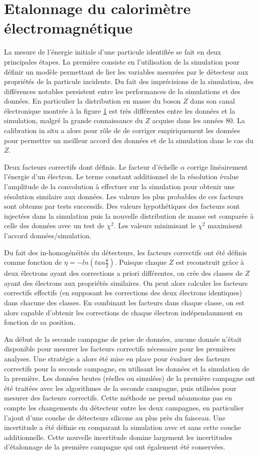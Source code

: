 \section{Etalonnage du calorimètre électromagnétique}

La mesure de l'énergie initiale d'une particule identifiée se fait en deux principales étapes.
La première consiste en l'utilisation de la simulation pour définir un modèle permettant de lier les variables mesurées par le détecteur aux propriétés de la particule incidente.
Du fait des imprécisions de la simulation, des différences notables persistent entre les performances de la simulations et des données.
En particulier la distribution en masse du boson $Z$ dans son canal électronique montrée à la figure \ref{} est très différentes entre les données et la simulation, malgré la grande connaissance du $Z$ acquise dans les années 80.
La calibration in situ a alors pour rôle de de corriger empiriquement les données pour permettre un meilleur accord des données et de la simulation dans le cas du $Z$.

Deux facteurs correctifs dont définis.
Le facteur d'échelle $\alpha$ corrige linéairement l'énergie d'un électron.
Le terme constant additionnel de la résolution évalue l'amplitude de la convolution à effectuer sur la simulation pour obtenir une résolution similaire aux données.
Les valeurs les plus probables de ces facteurs sont obtenus par tests successifs.
Des valeurs hypothétiques des facteurs sont injectées dans la simulation puis la nouvelle distribution de masse est comparée à celle des données avec un test de $\chi^2$.
Les valeurs minimisant le $\chi^2$ maximisent l'accord données/simulation.

Du fait des in-homogénéités du détecteurs, les facteurs correctifs ont été définis comme fonction de $\eta=-ln(tan\frac{\theta}{2})$.
Puisque chaque $Z$ est reconstruit grâce à deux électrons ayant des corrections a priori différentes, on crée des classes de $Z$ ayant des électrons aux propriétés similaires.
On peut alors calculer les facteurs correctifs effectifs (en supposant les corrections des deux électrons identiques) dans chacune des classes.
En combinant les facteurs dans chaque classe, on est alors capable d'obtenir les corrections de chaque électron indépendamment en fonction de sa position.

Au début de la seconde campagne de prise de données, aucune donnée n'était disponible pour mesurer les facteurs correctifs nécessaire pour les premières analyses.
Une stratégie a alors été mise en place pour évaluer des facteurs correctifs pour la seconde campagne, en utilisant les données et la simulation de la première.
Les données brutes (réelles ou simulées) de la première campagne ont été traitées avec les algorithmes de la seconde campagne, puis utilisées pour mesurer des facteurs correctifs.
Cette méthode ne prend néanmoins pas en compte les changements du détecteur entre les deux campagnes, en particulier l'ajout d'une couche de détecteurs silicone au plus près du faisceau.
Une incertitude a été définie en comparant la simulation avec et sans cette couche additionnelle.
Cette nouvelle incertitude  domine largement les incertitudes d'étalonnage de la première campagne qui ont également été conservées.


